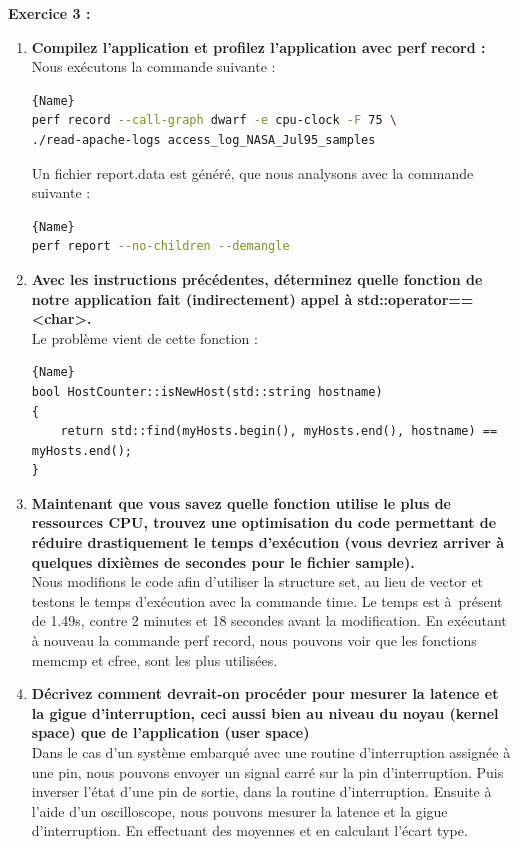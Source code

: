 \documentclass[
	a4paper, %
	10pt, %
]{CSUniSchoolLabReport}
\begin{document}

\textbf{Exercice 3 :}
\begin{enumerate}[label=\textbf{\arabic*}]

\item \textbf{Compilez l’application et profilez l’application avec perf record :}\\
Nous ex\'ecutons la commande suivante :
\begin{lstlisting}[language=bash, firstnumber=1]{Name}
perf record --call-graph dwarf -e cpu-clock -F 75 \
./read-apache-logs access_log_NASA_Jul95_samples
\end{lstlisting}

Un fichier report.data est généré, que nous analysons avec la commande suivante :
\begin{lstlisting}[language=bash, firstnumber=1]{Name}
perf report --no-children --demangle
\end{lstlisting}
\newpage
\item \textbf{Avec les instructions précédentes, déterminez quelle fonction de notre application fait (indirectement) appel à std::operator==<char>.}\\

Le probl\`eme vient de cette fonction :
\begin{lstlisting}[style=CStyle, caption=Extrait de hostcounter.cpp, firstnumber=1]{Name}
bool HostCounter::isNewHost(std::string hostname)
{
    return std::find(myHosts.begin(), myHosts.end(), hostname) == myHosts.end();
}
\end{lstlisting}

\item \textbf{Maintenant que vous savez quelle fonction utilise le plus de ressources CPU, trouvez une optimisation du code permettant de réduire drastiquement le temps d’exécution (vous devriez arriver à quelques dixièmes de secondes pour le fichier sample).}\\
Nous modifions le code afin d'utiliser la structure set, au lieu de vector et testons le temps d'ex\'ecution avec la commande time.
Le temps est \`a\ pr\'esent de 1.49s, contre 2 minutes et 18 secondes avant la modification.
En ex\'ecutant \`a nouveau la commande perf record, nous pouvons voir que les fonctions memcmp et cfree, sont les plus utilisées.

\item \textbf{Décrivez comment devrait-on procéder pour mesurer la latence et la gigue d’interruption, ceci aussi bien au niveau du noyau (kernel space) que de l’application (user space)}\\
Dans le cas d'un syst\`eme embarqué avec une routine d'interruption assignée \`a une pin, nous pouvons envoyer un signal carré sur la pin d'interruption.
Puis inverser l'\'etat d'une pin de sortie, dans la routine d'interruption.
Ensuite \`a l'aide d'un oscilloscope, nous pouvons mesurer la latence et la gigue d'interruption. En effectuant des moyennes et en calculant l'\'ecart type.\\
\end{enumerate}
\end{document}
